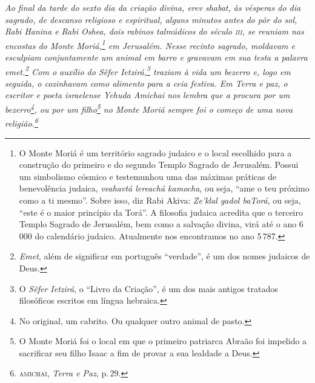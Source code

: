 


\blankpage
\pagebreak

{
\thispagestyle{empty}

\mbox{}

\vspace{5cm}

\footnotesize
\noindent{}\emph{\noindent{}Ao final da tarde do sexto dia da criação divina, \emph{erev shabat}, às vésperas do dia sagrado, de descanso religioso e espiritual, alguns minutos antes do pôr do sol, Rabi Hanina e Rabi Oshea, dois rabinos talmúdicos do século \textsc{iii}, se reuniam nas encostas do Monte Moriá,\footnote{O Monte Moriá é um território sagrado judaico e o local escolhido para a construção do primeiro e do segundo Templo Sagrado de Jerusalém. Possui um simbolismo cósmico e testemunhou uma das máximas práticas de benevolência judaica, \emph{veahavtá lereachá kamocha}, ou seja, ``ame o teu próximo como a ti mesmo''. Sobre isso, diz Rabi Akiva: \emph{Ze'klal gadol baTorá}, ou seja, ``este é o maior princípio da Torá''. A filosofia judaica acredita que o terceiro Templo Sagrado de Jerusalém, bem como a salvação divina, virá até o ano 6\,000 do calendário judaico. Atualmente nos encontramos no ano 5\,787.} em Jerusalém. Nesse recinto sagrado, moldavam e esculpiam conjuntamente um animal em barro e gravavam em sua testa a palavra \emph{emet}.\footnote{\emph{Emet}, além de significar em português ``verdade'', é um dos nomes judaicos de Deus.} Com o auxílio do \emph{Sêfer Ietzirá},\footnote{O \emph{Sêfer Ietzirá}, o ``Livro da Criação'', é um dos mais antigos tratados filosóficos escritos em língua hebraica.} traziam à vida um bezerro e, logo em seguida, o cozinhavam como alimento para a ceia festiva. Em \emph{Terra e paz}, o escritor e poeta israelense Yehuda Amichai nos lembra que a procura por um bezerro\footnote{No original, um cabrito. Ou qualquer outro animal de pasto.}, ou por um filho\footnote{O Monte Moriá foi o local em que o primeiro patriarca Abraão foi impelido a sacrificar seu filho Isaac a fim de provar a sua lealdade a Deus.} no Monte Moriá sempre foi o começo de uma nova religião.\footnote{\textsc{amichai}, \emph{Terra e Paz}, p.\,29.}}

\pagebreak
}

